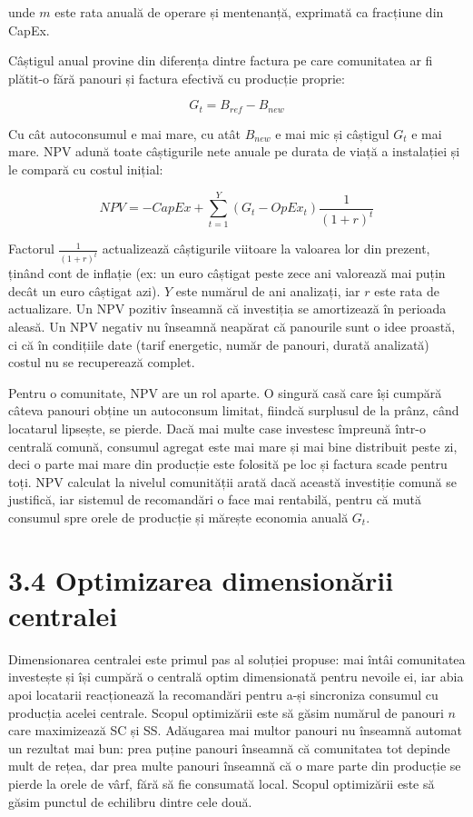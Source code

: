 \documentclass[12pt,a4paper]{report}
\begin{document}
unde $m$ este rata anuală de operare și mentenanță, exprimată ca fracțiune din CapEx.

Câștigul anual provine din diferența dintre factura pe care comunitatea ar fi plătit-o fără panouri și factura efectivă cu producție proprie:

\begin{equation}
  G_t = B_{ref} - B_{new}
  \label{eq:gain}
\end{equation}

Cu cât autoconsumul e mai mare, cu atât $B_{new}$ e mai mic și câștigul $G_t$ e mai mare. NPV adună toate câștigurile nete anuale pe durata de viață a instalației și le compară cu costul inițial:

\begin{equation}
  NPV = -CapEx + \sum_{t=1}^{Y} \left(G_t - OpEx_t\right) \frac{1}{(1 + r)^t}
  \label{eq:npv}
\end{equation}

Factorul $\frac{1}{(1+r)^t}$ actualizează câștigurile viitoare la valoarea lor din prezent, ținând cont de inflație (ex: un euro câștigat peste zece ani valorează mai puțin decât un euro câștigat azi). $Y$ este numărul de ani analizați, iar $r$ este rata de actualizare. Un NPV pozitiv înseamnă că investiția se amortizează în perioada aleasă. Un NPV negativ nu înseamnă neapărat că panourile sunt o idee proastă, ci că în condițiile date (tarif energetic, număr de panouri, durată analizată) costul nu se recuperează complet.

Pentru o comunitate, NPV are un rol aparte. O singură casă care își cumpără câteva panouri obține un autoconsum limitat, fiindcă surplusul de la prânz, când locatarul lipsește, se pierde. Dacă mai multe case investesc împreună într-o centrală comună, consumul agregat este mai mare și mai bine distribuit peste zi, deci o parte mai mare din producție este folosită pe loc și factura scade pentru toți. NPV calculat la nivelul comunității arată dacă această investiție comună se justifică, iar sistemul de recomandări o face mai rentabilă, pentru că mută consumul spre orele de producție și mărește economia anuală $G_t$.

\section*{3.4 Optimizarea dimensionării centralei}

Dimensionarea centralei este primul pas al soluției propuse: mai întâi comunitatea investește și își cumpără o centrală optim dimensionată pentru nevoile ei, iar abia apoi locatarii reacționează la recomandări pentru a-și sincroniza consumul cu producția acelei centrale. Scopul optimizării este să găsim numărul de panouri $n$ care maximizează SC și SS. Adăugarea mai multor panouri nu înseamnă automat un rezultat mai bun: prea puține panouri înseamnă că comunitatea tot depinde mult de rețea, dar prea multe panouri înseamnă că o mare parte din producție se pierde la orele de vârf, fără să fie consumată local. Scopul optimizării este să găsim punctul de echilibru dintre cele două.
\end{document}
